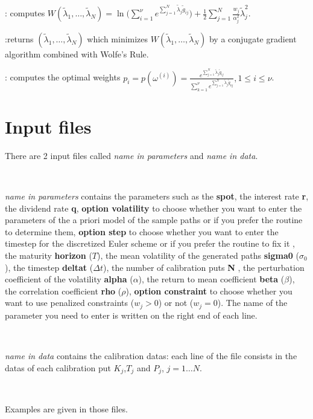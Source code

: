 \documentclass[a4paper,11pt]{article}
\begin{document}
\begin{flushleft}
\vspace{0.5 cm}

: computes $W(\tilde{\lambda}_1, \hdots,
\tilde{\lambda}_N)=\ln\bigg(\sum_{i=1}^{\nu}{e^{\sum_{j=1}^{N}{\tilde{\lambda}_j\tilde{g}_{ij}}}}\bigg)+\frac{1}{2}\sum_{j=1}^{N}{
  \frac{w_j}{\alpha_j^2}\tilde{\lambda}_j^2}$.

\vspace{0.5 cm}

:returns $(\tilde{\lambda}_{1}, \hdots,
\tilde{\lambda}_N)$ which minimizes  $W(\tilde{\lambda}_1, \hdots,
\tilde{\lambda}_N)$  by a conjugate gradient algorithm combined
with Wolfe's Rule.

\vspace{0.5 cm}

: computes the optimal weights
$p_i=p(\omega^{(i)})=\frac{e^{\sum_{j=1}^{N}{\tilde{\lambda}_j\tilde{g}_{ij}}}}{\sum_{k=1}^{\nu}{e^{\sum_{j=1}^{N}{\tilde{\lambda}_j\tilde{g}_{kj}}}}},
1 \leq i \leq \nu$.

\section*{Input files}

There are 2 input files called \emph{name in parameters} and
\emph{name in data}.

\

\emph{name in parameters} contains the parameters such as the
\textbf{spot}, the interest rate \textbf{r}, the dividend rate
\textbf{q}, \textbf{option volatility} to choose whether you want
to enter the parameters of the a priori model of the sample paths
or if you prefer the routine to determine them, \textbf{option
step} to choose whether you want to enter the timestep for the
discretized Euler scheme or if you prefer the routine to fix it
, the maturity \textbf{horizon} ($T$), the mean volatility of the
generated paths \textbf{sigma0} ($\sigma_0$), the timestep \textbf{deltat} ($\Delta t$), the
number of calibration puts \textbf{N} , the perturbation coefficient of
the volatility
\textbf{alpha} ($\alpha$), the return to mean coefficient \textbf{beta}
($\beta$), the correlation coefficient
\textbf{rho} ($\rho$), \textbf{option constraint} to choose whether you want
to use penalized constraints ($w_j>0$) or not ($w_j=0$). The name of the parameter you
need to enter is written on the right end of each line.

\

\emph{name in data} contains the calibration datas: each line of
the file consists in the datas of each calibration put $ K_j$,$T_j$
and $P_j$, $j=1 \hdots N$.

\

Examples are given in those files.
\end{flushleft}
\end{document}
